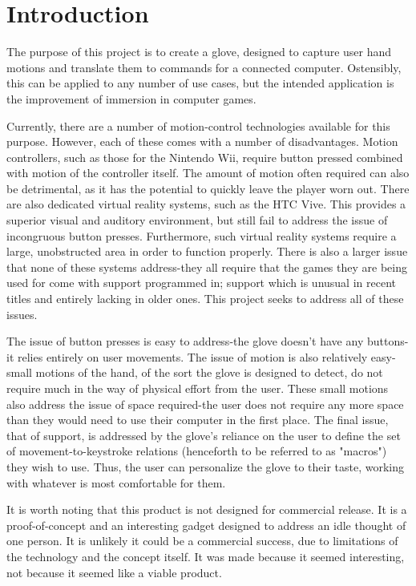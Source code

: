 \documentclass{article}
\begin{document}
	\section{Introduction}
	 The purpose of this project is to create a glove, designed to capture user hand motions and translate them to commands for a connected computer. Ostensibly, this can be applied to any number of use cases, but the intended application is the improvement of immersion in computer games.
	 
	 Currently, there are a number of motion-control technologies available for this purpose. However, each of these comes with a number of disadvantages. Motion controllers, such as those for the Nintendo Wii, require button pressed combined with motion of the controller itself. The amount of motion often required can also be detrimental, as it has the potential to quickly leave the player worn out. There are also dedicated virtual reality systems, such as the HTC Vive. This provides a superior visual and auditory environment, but still fail to address the issue of incongruous button presses. Furthermore, such virtual reality systems require a large, unobstructed area in order to function properly. There is also a larger issue that none of these systems address-they all require that the games they are being used for come with support programmed in; support which is unusual in recent titles and entirely lacking in older ones. This project seeks to address all of these issues.
	 
	 The issue of button presses is easy to address-the glove doesn't have any buttons-it relies entirely on user movements. The issue of motion is also relatively easy-small motions of the hand, of the sort the glove is designed to detect, do not require much in the way of physical effort from the user. These small motions also address the issue of space required-the user does not require any more space than they would need to use their computer in the first place. The final issue, that of support, is addressed by the glove's reliance on the user to define the set of movement-to-keystroke relations (henceforth to be referred to as "macros") they wish to use. Thus, the user can personalize the glove to their taste, working with whatever is most comfortable for them.
	 
	 It is worth noting that this product is not designed for commercial release. It is a proof-of-concept and an interesting gadget designed to address an idle thought of one person. It is unlikely it could be a commercial success, due to limitations of the technology and the concept itself. It was made because it seemed interesting, not because it seemed like a viable product.
\end{document}
